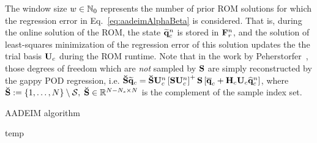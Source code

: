 The window size $w \in \mathbb{N}_0$ represents the number of prior ROM solutions for which the regression error in Eq.~\ref{eq:aadeimAlphaBeta} is considered. That is, during the online solution of the ROM, the state $\mathbf{\widetilde{q}}_{c}^{n}$ is stored in $\resWindow^{\timeIdx}$, and the solution of least-squares minimization of the regression error of this solution updates the the trial basis $\consTrial$ during the ROM runtime. Note that in the work by Peherstorfer~\cite{Peherstorfer2020Adaptive}, those degrees of freedom which are \textit{not} sampled by $\mathbf{S}$ are simply reconstructed by the gappy POD regression, i.e. $\sampMatComp \consVecRom = \sampMatComp \consTrial^{\timeIdx} \left[\sampMat \consTrial^{\timeIdx}\right]^+ \sampMat \left[\consVecCent + \consScale \consTrial \consVecCoef^{\timeIdx}\right]$, where $\mathbf{\breve{S}} := \{1,\hdots,N \} \setminus \mathcal{S}, \; \mathbf{\breve{S}} \in \mathbb{R}^{N-N_s \times N}$ is the complement of the sample index set.

\begin{algorithm}
	\caption{AADEIM algorithm}\label{alg:aadeim}
	\begin{algorithmic}
		\STATE temp
	\end{algorithmic}
\end{algorithm}

